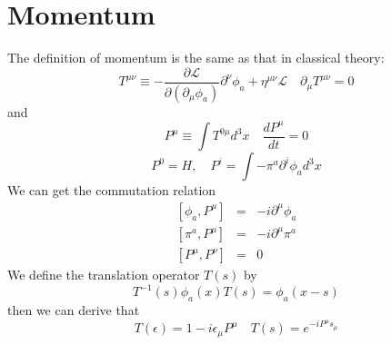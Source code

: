 \section{Momentum}
\noindent
The definition of momentum is the same as that in classical theory:
\[T^{\mu \nu} \equiv -\frac{\partial \mathcal{L}}{\partial(\partial_{\mu}\phi_a)} \partial^{\nu} \phi_a + \eta^{\mu \nu} \mathcal{L} \quad \partial_{\mu} T^{\mu \nu} = 0\]
and
\[P^{\mu} \equiv \int T^{0 \mu} d^3 x \quad \frac{d P^{\mu}}{dt} = 0\]
\[P^{0} = H, \quad P^{i} = \int -\pi^a \partial^i \phi_a d^3 x\]
We can get the commutation relation
\begin{eqnarray}
\left[\phi_a,P^{\mu}\right] &=& -i\partial^{\mu} \phi_a \nonumber \\
\left[\pi^a,P^{\mu}\right] &=& -i\partial^{\mu} \pi^a \nonumber \\
\left[P^{\mu},P^{\nu}\right] &=& 0 \nonumber 
\end{eqnarray}
We define the translation operator $T(s)$ by
\[T^{-1}(s) \phi_a(x) T(s) = \phi_a(x-s)\]
then we can derive that
\[T(\epsilon) = 1 - i\epsilon_{\mu} P^{\mu} \quad T(s) = e^{-iP^{\mu}s_{\mu}}\]


